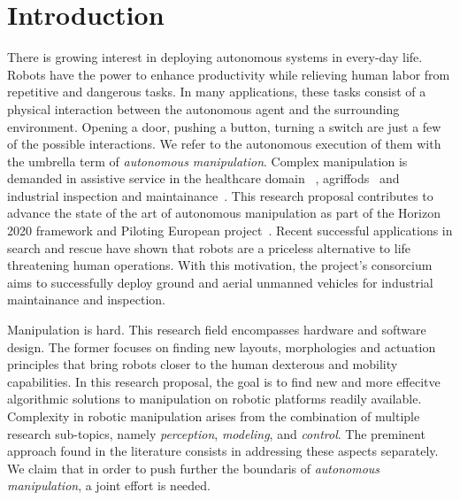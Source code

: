 \section{Introduction}
\label{sec:Introduction}



There is growing interest in deploying autonomous systems in every-day life. Robots have the power to enhance productivity while relieving human labor from repetitive and dangerous tasks. In many applications, these tasks consist of a physical interaction between the autonomous agent and the surrounding environment. Opening a door, pushing a button, turning a switch are just a few of the possible interactions. We refer to the autonomous execution of them with the umbrella term of \emph{autonomous manipulation}. Complex manipulation is demanded in assistive service in the healthcare domain~\cite{cooper2020ari} , agriffods~\cite{duckett2018agricultural} and industrial inspection and maintainance~\cite{lattanzi2017review}. This research proposal contributes to advance the state of the art of autonomous manipulation as part of the Horizon 2020 framework and Piloting European project~\cite{eu-piloting-2020}. Recent successful applications in search and rescue have shown that robots are a priceless alternative to life threatening human operations. With this motivation, the project's consorcium aims to successfully deploy ground and aerial unmanned vehicles for industrial maintainance and inspection. 


Manipulation is hard. This research field encompasses hardware and software design. The former focuses on finding new layouts, morphologies and actuation principles that bring robots closer to the human dexterous and mobility capabilities. In this research proposal, the goal is to find new and more effecitve algorithmic solutions to manipulation on robotic platforms readily available. Complexity in robotic manipulation arises from the combination of multiple research sub-topics, namely \emph{perception}, \emph{modeling}, and \emph{control}. The preminent approach found in the literature consists in addressing these aspects separately. We claim that in order to push further the boundaris of \emph{autonomous manipulation}, a joint effort is needed. 

